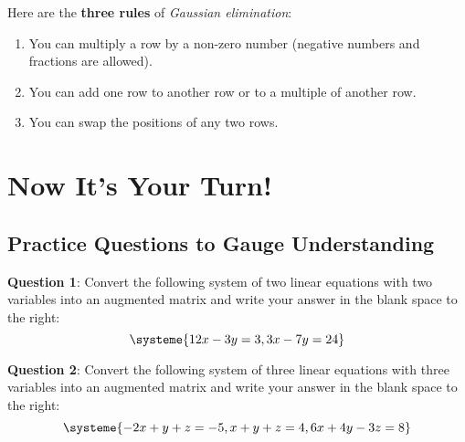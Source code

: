 \documentclass[12pt,tiks]{article}
\begin{document}
    Here are the \textbf{three rules} of \textit{Gaussian elimination}:
    \begin{enumerate}
        \item You can multiply a row by a non-zero number (negative numbers and fractions are allowed).
        \item You can add one row to another row or to a multiple of another row.
        \item You can swap the positions of any two rows.
    \end{enumerate}
    
\section*{Now It's Your Turn!}
    \subsection*{Practice Questions to Gauge Understanding}
    \begin{minipage}[t][.7in][t]{3in}\RaggedRight
    \-\vspace*{.1in}
    \textbf{Question 1}: Convert the following system of two linear equations with two variables into an augmented matrix and write your answer in the blank space to the right:
        \begin{equation*}
          \systeme{
                  12x-3y=3,
                  3x-7y=24
                  }
        \end{equation*}
    \end{minipage}
    
    \hspace{.1in}\vspace{1in}
    
    \begin{minipage}[t][.7in][t]{3in}\RaggedRight
    \-\vspace*{.1in}
    \textbf{Question 2}: Convert the following system of three linear equations with three variables into an augmented matrix and write your answer in the blank space to the right:
        \begin{equation*}
          \systeme{
                  -2x + y + z = -5,
                  x + y + z = 4,
                  6x + 4y -3z = 8
                  }
        \end{equation*}
    \end{minipage}
    
    \hspace{.1in}\vspace{.5in}
    
\end{document}
